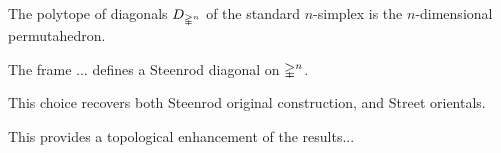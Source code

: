 \begin{lemma}
	The polytope of diagonals $D_{\mathbb{\Delta}^n}$ of the standard $n$-simplex is the $n$-dimensional permutahedron.
\end{lemma}

\begin{lemma}
	The frame ... defines a Steenrod diagonal on $\mathbb{\Delta}^n$.
\end{lemma}

\begin{theorem}
	This choice recovers both Steenrod original construction, and Street orientals.
\end{theorem}

This provides a topological enhancement of the results...




